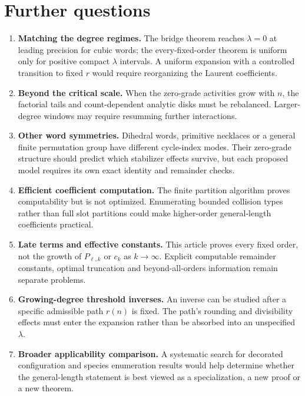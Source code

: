 \documentclass[11pt]{article}
\theoremstyle{definition}\newtheorem{definition}[theorem]{Definition}
\theoremstyle{remark}\newtheorem{remark}[theorem]{Remark}
\numberwithin{equation}{section}
\begin{document}
\section{Further questions}\label{rcw:sec:further}
\begin{enumerate}
\item \textbf{Matching the degree regimes.} The bridge theorem reaches $\lambda=0$ at leading precision for cubic words; the every-fixed-order theorem is uniform only for positive compact $\lambda$ intervals. A uniform expansion with a controlled transition to fixed $r$ would require reorganizing the Laurent coefficients.
\item \textbf{Beyond the critical scale.} When the zero-grade activities grow with $n$, the factorial tails and count-dependent analytic disks must be rebalanced. Larger-degree windows may require resumming further interactions.
\item \textbf{Other word symmetries.} Dihedral words, primitive necklaces or a general finite permutation group have different cycle-index modes. Their zero-grade structure should predict which stabilizer effects survive, but each proposed model requires its own exact identity and remainder checks.
\item \textbf{Efficient coefficient computation.} The finite partition algorithm proves computability but is not optimized. Enumerating bounded collision types rather than full slot partitions could make higher-order general-length coefficients practical.
\item \textbf{Late terms and effective constants.} This article proves every fixed order, not the growth of $P_{\ell,k}$ or $c_k$ as $k\to\infty$. Explicit computable remainder constants, optimal truncation and beyond-all-orders information remain separate problems.
\item \textbf{Growing-degree threshold inverses.} An inverse can be studied after a specific admissible path $r(n)$ is fixed. The path's rounding and divisibility effects must enter the expansion rather than be absorbed into an unspecified $\lambda$.
\item \textbf{Broader applicability comparison.} A systematic search for decorated configuration and species enumeration results would help determine whether the general-length statement is best viewed as a specialization, a new proof or a new theorem.
\end{enumerate}
\end{document}
